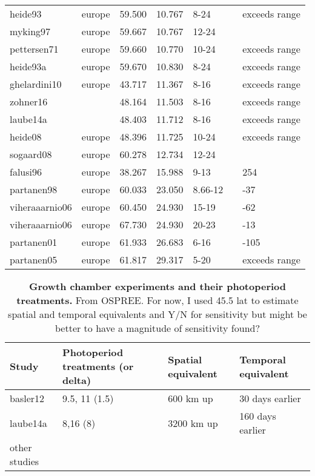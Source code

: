 \documentclass{article}
\begin{document}
\begin{table}[ht]
\begin{tabular}{|p{}|p{}|p{}|p{}|p{}|p{}|p{}|}
  heide93 & europe & 59.500 & 10.767 & 8-24 &  & exceeds range \\ 
  myking97 & europe & 59.667 & 10.767 & 12-24 &  &  \\ 
  pettersen71 & europe & 59.660 & 10.770 & 10-24 &  & exceeds range \\ 
  heide93a & europe & 59.670 & 10.830 & 8-24 &  & exceeds range \\ 
  ghelardini10 & europe & 43.717 & 11.367 & 8-16 &  & exceeds range \\ 
  zohner16 &  & 48.164 & 11.503 & 8-16 &  & exceeds range \\ 
  laube14a &  & 48.403 & 11.712 & 8-16 &  & exceeds range \\ 
  heide08 & europe & 48.396 & 11.725 & 10-24 &  & exceeds range \\ 
  sogaard08 & europe & 60.278 & 12.734 & 12-24 &  &  \\ 
  falusi96 & europe & 38.267 & 15.988 & 9-13 &  & 254 \\ 
  partanen98 & europe & 60.033 & 23.050 & 8.66-12 &  & -37 \\ 
  viheraaarnio06 & europe & 60.450 & 24.930 & 15-19 &  & -62 \\ 
  viheraaarnio06 & europe & 67.730 & 24.930 & 20-23 &  & -13 \\ 
  partanen01 & europe & 61.933 & 26.683 & 6-16 &  & -105 \\ 
  partanen05 & europe & 61.817 & 29.317 & 5-20 &  & exceeds range \\ 
   \hline
\end{tabular}
\end{table}\clearpage
\begin{table}[p]
  \caption{\textbf{Growth chamber experiments and their photoperiod treatments.} From OSPREE. For now, I used 45.5 lat to estimate spatial and temporal equivalents and Y/N for sensitivity but might be better to have a magnitude of sensitivity found?}
\begin{footnotesize} 
   \begin{tabular}{| p{1cm} | p{3.8cm} | p{2.9 cm} | p{3.2 cm} |}
    \hline
  \bf{Study} & \bf{Photoperiod treatments (or delta)} & \bf{Spatial equivalent} & \bf{Temporal equivalent}\\ \hline
    basler12 & 9.5, 11 (1.5) &  600 km up & 30 days earlier \\ \hline
    laube14a & 8,16 (8) &  3200 km up & 160 days earlier \\ \hline
    other studies &  &   & \\ \hline

     \end{tabular}    
\end{footnotesize} 
    \end{table}
\clearpage
\end{document}
